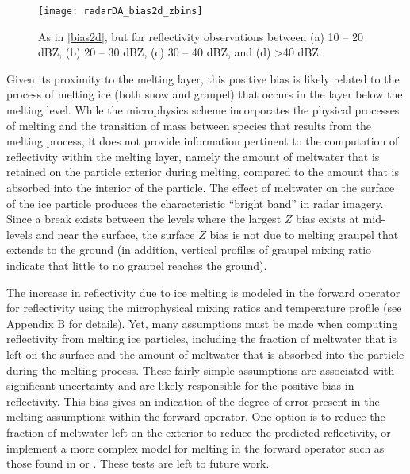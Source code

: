 \begin{figure}
\centering
\texttt{[image: radarDA\_bias2d\_zbins]}
\caption{As in \ref{bias2d}, but for reflectivity observations between (a) 10 -- 20 dBZ, (b) 20 -- 30 dBZ, (c) 30 -- 40 dBZ, and (d) \textgreater 40 dBZ.}
\label{bias2d_zbins}
\end{figure}

Given its proximity to the melting layer, this positive bias is likely related to the process of melting ice (both snow and graupel) that occurs in the layer below the melting level. While the microphysics scheme incorporates the physical processes of melting and the transition of mass between species that results from the melting process, it does not provide information pertinent to the computation of reflectivity within the melting layer, namely the amount of meltwater that is retained on the particle exterior during melting, compared to the amount that is absorbed into the interior of the particle. The effect of meltwater on the surface of the ice particle produces the characteristic “bright band” in radar imagery. Since a break exists between the levels where the largest \(Z\) bias exists at mid-levels and near the surface, the surface \(Z\) bias is not due to melting graupel that extends to the ground (in addition, vertical profiles of graupel mixing ratio indicate that little to no graupel reaches the ground).
	
The increase in reflectivity due to ice melting is modeled in the forward operator for reflectivity using the microphysical mixing ratios and temperature profile (see Appendix B for details). Yet, many assumptions must be made when computing reflectivity from melting ice particles, including the fraction of meltwater that is left on the surface and the amount of meltwater that is absorbed into the particle during the melting process. These fairly simple assumptions are associated with significant uncertainty and are likely responsible for the positive bias in reflectivity. This bias gives an indication of the degree of error present in the melting assumptions within the forward operator. One option is to reduce the fraction of meltwater left on the exterior to reduce the predicted reflectivity, or implement a more complex model for melting in the forward operator such as those found in \citet{jungetal10} or \citet{dawsonetal13}. These tests are left to future work.

